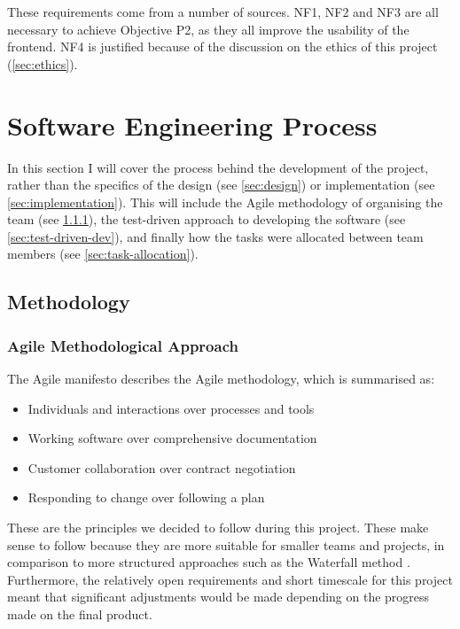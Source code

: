 \documentclass[12pt, letterpaper]{article}
\begin{document}
\begin{flushleft}
These requirements come from a number of sources. NF1, NF2 and NF3 are all necessary to achieve Objective P2, as they all improve the usability of the frontend. NF4 is justified because of the discussion on the ethics of this project (\ref{sec:ethics}).
\end{flushleft}

\section{Software Engineering Process}

\begin{flushleft}
In this section I will cover the process behind the development of the project, rather than the specifics of the design (see \ref{sec:design}) or implementation (see \ref{sec:implementation}). This will include the Agile methodology of organising the team (see \ref{sec:agile-methodology}), the test-driven approach to developing the software (see \ref{sec:test-driven-dev}), and finally how the tasks were allocated between team members (see \ref{sec:task-allocation}).
\end{flushleft}

\subsection{Methodology}

\subsubsection{Agile Methodological Approach}\label{sec:agile-methodology}

The Agile manifesto describes the Agile methodology, which is summarised as:

\begin{displayquote}
    \begin{itemize}
    \item Individuals and interactions over processes and tools
    \item Working software over comprehensive documentation
    \item Customer collaboration over contract negotiation
    \item Responding to change over following a plan
    \end{itemize}
    \cite{agile-manifesto}
\end{displayquote}

\begin{flushleft}
These are the principles we decided to follow during this project. These make sense to follow because they are more suitable for smaller teams and projects, in comparison to more structured approaches such as the Waterfall method \cite{waterfall}. Furthermore, the relatively open requirements and short timescale for this project meant that significant adjustments would be made depending on the progress made on the final product.
\end{flushleft}
\end{document}
